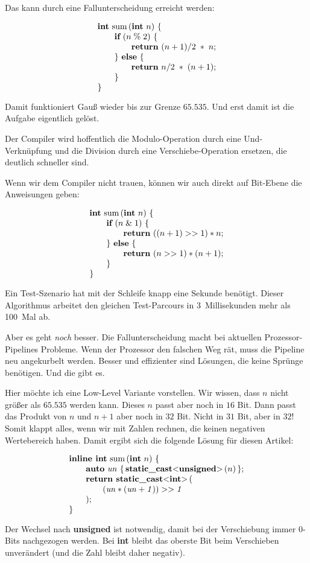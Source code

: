 Das kann durch eine Fallunterscheidung erreicht werden:

$$\vbox{\halign{#\hfil\cr
{\bf int} sum$\,$({\bf int} $n$) $\{$\cr
\qquad{\bf if} ($n\mathrel\% 2$) $\{$\cr
\qquad\qquad{\bf return} $(n + 1)/2\;*\;n$;\cr
\qquad$\}$ {\bf else} $\{$\cr
\qquad\qquad{\bf return} $n/2 \;*\; (n + 1)$;\cr
\qquad$\}$\cr
$\}$\cr}}$$

\noindent Damit funktioniert Gauß wieder bis zur Grenze $65.535$.
Und erst damit ist die Aufgabe eigentlich gelöst.

Der Compiler wird hoffentlich die Modulo-Operation durch eine
Und-Verknüpfung und die Division durch eine
Verschiebe-Operation ersetzen, die deutlich schneller sind.

Wenn wir dem Compiler nicht trauen, können wir auch direkt
auf Bit-Ebene die Anweisungen geben:

$$\vbox{\halign{#\hfil\cr
{\bf int} sum$\,$({\bf int} $n$) $\{$\cr
\qquad{\bf if} ($n \mathrel\& 1$) $\{$\cr
\qquad\qquad{\bf return} $((n + 1) >> 1) * n$;\cr
\qquad$\}$ {\bf else} $\{$\cr
\qquad\qquad{\bf return} $(n >> 1) * (n + 1)$;\cr
\qquad$\}$\cr
$\}$\cr}}$$

\noindent Ein Test-Szenario hat mit der Schleife knapp eine Sekunde benötigt.
Dieser Algorithmus arbeitet den gleichen Test-Parcours in 3~Millisekunden
mehr als 100~Mal ab.

Aber es geht {\it noch\/} besser.
Die Fallunterscheidung macht bei aktuellen Prozessor-Pipelines
Probleme.
Wenn der Prozessor den falschen Weg rät, muss die
Pipeline neu angekurbelt werden.
Besser und effizienter sind Lösungen, die keine
Sprünge benötigen.
Und die gibt es.

Hier möchte ich eine Low-Level Variante vorstellen.
Wir wissen, dass $n$ nicht größer als $65.535$ werden
kann.
Dieses $n$ passt aber noch in $16$ Bit.
Dann passt das Produkt von $n$ und $n+1$ aber noch in
$32$ Bit.
Nicht in $31$ Bit, aber in $32$!
Somit klappt alles, wenn wir mit Zahlen rechnen, die
keinen negativen Wertebereich haben.
Damit ergibt sich die folgende Lösung für diesen Artikel:

$$\vbox{\halign{#\hfil\cr
{\bf inline int} sum$\,$({\bf int} $n$) $\{$\cr
\qquad{\bf auto} $\it un$ $\{\,${\bf static\_cast}<{\bf unsigned}>$\,$($n$)$\,\}$;\cr
\qquad{\bf return static\_cast}<{\bf int}>$\,$(\cr
\qquad\qquad$(\it un * (\it un + 1)) >> 1$\cr
\qquad);\cr
$\}$\cr}}$$

\noindent Der Wechsel nach {\bf unsigned} ist notwendig, damit
bei der Verschiebung immer $0$-Bits nachgezogen werden.
Bei {\bf int} bleibt das oberste Bit beim Verschieben unverändert
(und die Zahl bleibt daher negativ).

